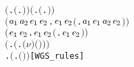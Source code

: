\begin{alltt}
\HOLTokenTurnstile{} \ensuremath{(}\HOLSymConst{\HOLTokenForall{}}.  \ensuremath{(}\HOLTokenLambda{}. \ensuremath{)}\ensuremath{)} \HOLSymConst{\HOLTokenConj{}} \ensuremath{(}\HOLSymConst{\HOLTokenForall{}} .   \HOLSymConst{\HOLTokenImp{}}  \ensuremath{(}\HOLTokenLambda{}. \HOLSymConst{\ensuremath{\ldotp}} \ensuremath{)}\ensuremath{)} \HOLSymConst{\HOLTokenConj{}}
   \ensuremath{(}\HOLSymConst{\HOLTokenForall{}}\ensuremath{\HOLBoundVar{a}\sb{\mathrm{1}}} \ensuremath{\HOLBoundVar{a}\sb{\mathrm{2}}} \ensuremath{\HOLBoundVar{e}\sb{\mathrm{1}}} \ensuremath{\HOLBoundVar{e}\sb{\mathrm{2}}}.  \ensuremath{\HOLBoundVar{e}\sb{\mathrm{1}}} \HOLSymConst{\HOLTokenConj{}}  \ensuremath{\HOLBoundVar{e}\sb{\mathrm{2}}} \HOLSymConst{\HOLTokenImp{}}  \ensuremath{(}\HOLTokenLambda{}. \ensuremath{\HOLBoundVar{a}\sb{\mathrm{1}}}\HOLSymConst{\ensuremath{\ldotp}}\ensuremath{\HOLBoundVar{e}\sb{\mathrm{1}}}  \HOLSymConst{\ensuremath{+}} \ensuremath{\HOLBoundVar{a}\sb{\mathrm{2}}}\HOLSymConst{\ensuremath{\ldotp}}\ensuremath{\HOLBoundVar{e}\sb{\mathrm{2}}} \ensuremath{)}\ensuremath{)} \HOLSymConst{\HOLTokenConj{}}
   \ensuremath{(}\HOLSymConst{\HOLTokenForall{}}\ensuremath{\HOLBoundVar{e}\sb{\mathrm{1}}} \ensuremath{\HOLBoundVar{e}\sb{\mathrm{2}}}.  \ensuremath{\HOLBoundVar{e}\sb{\mathrm{1}}} \HOLSymConst{\HOLTokenConj{}}  \ensuremath{\HOLBoundVar{e}\sb{\mathrm{2}}} \HOLSymConst{\HOLTokenImp{}}  \ensuremath{(}\HOLTokenLambda{}. \ensuremath{\HOLBoundVar{e}\sb{\mathrm{1}}}  \HOLSymConst{\ensuremath{\mid}} \ensuremath{\HOLBoundVar{e}\sb{\mathrm{2}}} \ensuremath{)}\ensuremath{)} \HOLSymConst{\HOLTokenConj{}}
   \ensuremath{(}\HOLSymConst{\HOLTokenForall{}} .   \HOLSymConst{\HOLTokenImp{}}  \ensuremath{(}\HOLTokenLambda{}. \ensuremath{(\nu}\ensuremath{)} \ensuremath{(} \ensuremath{)}\ensuremath{)}\ensuremath{)} \HOLSymConst{\HOLTokenConj{}}
   \HOLSymConst{\HOLTokenForall{}} .   \HOLSymConst{\HOLTokenImp{}}  \ensuremath{(}\HOLTokenLambda{}.  \ensuremath{(} \ensuremath{)} \ensuremath{)}\hfill{[WGS_rules]}
\end{alltt}

